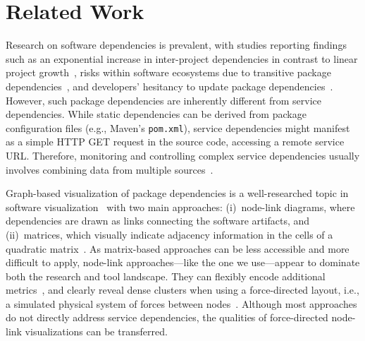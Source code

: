 \documentclass[conference]{IEEEtran}
\begin{document}
\section{Related Work}
\label{sec:related-work}

Research on software dependencies is prevalent, with studies reporting findings such as an exponential increase in inter-project dependencies in contrast to linear project growth~\cite{bavota2013evolution}, risks within software ecosystems due to transitive package dependencies~\cite{kikas2017structure}, and developers' hesitancy to update package dependencies~\cite{kula2018developers}. %
However, such package dependencies are inherently different from service dependencies.
While static dependencies can be derived from package configuration files (e.g., Maven's \texttt{pom.xml}), service dependencies might manifest as a simple HTTP GET request in the source code, accessing a remote service URL.
Therefore, monitoring and controlling complex service dependencies usually involves combining data from multiple sources~\cite{DBLP:journals/queue/EsparrachiariRR18}.

Graph-based visualization of package dependencies is a well-researched topic in software visualization~\cite{10.1016/j.jss.2014.03.071} %
with two main approaches: (i)~node-link diagrams, where dependencies are drawn as links connecting the software artifacts, and (ii)~matrices, which visually indicate adjacency information in the cells of a quadratic matrix~\cite{DBLP:phd/de/Beck2013}. %
As matrix-based approaches can be less accessible and more difficult to apply, node-link approaches---like the one we use---appear to dominate both the research and tool landscape. They can flexibly encode additional metrics~\cite{10.1109/vissof.2011.6069454}, and clearly reveal dense clusters when using a force-directed layout, i.e., a simulated physical system of forces between nodes~\cite{10.1145/1409720.1409735}. %
Although most approaches do not directly address service dependencies, the qualities of force-directed node-link visualizations can be transferred.
\end{document}
